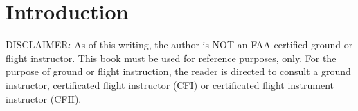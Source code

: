 \section*{Introduction}

DISCLAIMER: As of this writing, the author is NOT an FAA-certified ground or flight instructor. This book must be used for reference purposes, only. For the purpose of ground or flight instruction, the reader is directed to consult a ground instructor, certificated flight instructor (CFI) or certificated flight instrument instructor (CFII).
